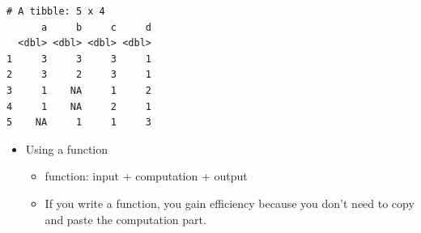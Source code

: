 \documentclass[
  letterpaper,
  DIV=11,
  numbers=noendperiod]{scrreprt}
\newenvironment{Shaded}{\begin{snugshade}}{\end{snugshade}}
\newcommand{\CommentTok}[1]{\textcolor[rgb]{0.37,0.37,0.37}{#1}}
\newcommand{\ConstantTok}[1]{\textcolor[rgb]{0.56,0.35,0.01}{#1}}
\newcommand{\DecValTok}[1]{\textcolor[rgb]{0.68,0.00,0.00}{#1}}
\newcommand{\NormalTok}[1]{\textcolor[rgb]{0.00,0.23,0.31}{#1}}
\newcommand{\OtherTok}[1]{\textcolor[rgb]{0.00,0.23,0.31}{#1}}
\newcommand{\SpecialCharTok}[1]{\textcolor[rgb]{0.37,0.37,0.37}{#1}}
\providecommand{\tightlist}{%
  \setlength{\itemsep}{0pt}\setlength{\parskip}{0pt}}\usepackage{longtable,booktabs,array}
\begin{document}
\begin{Shaded}
\end{Shaded}

\begin{verbatim}
# A tibble: 5 x 4
      a     b     c     d
  <dbl> <dbl> <dbl> <dbl>
1     3     3     3     1
2     3     2     3     1
3     1    NA     1     2
4     1    NA     2     1
5    NA     1     1     3
\end{verbatim}

\begin{itemize}
\tightlist
\item
  Using a function

  \begin{itemize}
  \tightlist
  \item
    function: input + computation + output
  \item
    If you write a function, you gain efficiency because you don't need
    to copy and paste the computation part.
  \end{itemize}
\end{itemize}
\end{document}
